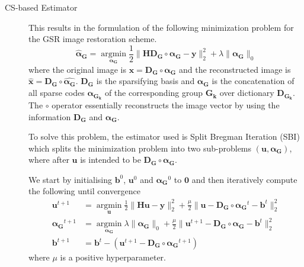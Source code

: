 \documentclass[a4paper]{article}
\begin{document}
\begin{description}
	\item[CS-based Estimator] 
	This results in the formulation of the following minimization problem for the GSR image restoration scheme.
	\begin{equation}
	\bm{\hat{\alpha}_G} = \operatorname*{argmin}_{\bm{\alpha_G}} \frac{1}{2}\|\bm{HD_G}\circ\bm{\alpha_G}-\bm{y}\|_2^2 + \lambda\|\bm{\alpha_G}\|_0
	\end{equation}
	where the original image is $\bm{x}=\bm{D_G}\circ\bm{\alpha_G}$ and the reconstructed image is $\hat{\bm{x}}=\bm{D_G}\circ\bm{\hat{\alpha_G}}$. $\bm{D_G}$ is the sparsifying basis and $\bm{\alpha_G}$ is the concatenation of all sparse codes $\bm{\alpha_{G_k}}$ of the corresponding group $\bm{G_k}$ over dictionary $\bm{D_{G_k}}$. The $\circ$ operator essentially reconstructs the image vector by using the information $\bm{D_G}$ and $\bm{\alpha_G}$.

	To solve this problem, the estimator used is Split Bregman Iteration (SBI) which splits the minimization problem into two sub-problems $(\bm{u}, \bm{\alpha_G})$, where after $\bm{u}$ is intended to be $\bm{D_G}\circ\bm{\alpha_G}$.

	We start by initialising $\bm{b}^0$, $\bm{u}^0$ and $\bm{\alpha_G}^0$ to $\bm{0}$ and then iteratively compute the following until convergence
	\begin{align}
	\bm{u}^{t+1} &= \operatorname*{argmin}_{\bm{u}} \frac{1}{2}\|\bm{Hu}-\bm{y}\|_2^2 +\frac{\mu}{2}\|\bm{u}-\bm{D_G}\circ\bm{\alpha_G}^{t} - \bm{b}^{t}\|_2^2\\
	\bm{\alpha_G}^{t+1} &= \operatorname*{argmin}_{\bm{\alpha_{G}}} \lambda\|\bm{\alpha_G}\|_0 +\frac{\mu}{2}\|\bm{u}^{t+1}-\bm{D_G}\circ\bm{\alpha_G} - \bm{b}^{t}\|_2^2\\
	\bm{b}^{t+1} &=  \bm{b}^{t} - (\bm{u}^{t+1}-\bm{D_G}\circ\bm{\alpha_G}^{t+1})
	\end{align}
	where $\mu$ is a positive hyperparameter.
\end{description}
\end{document}
